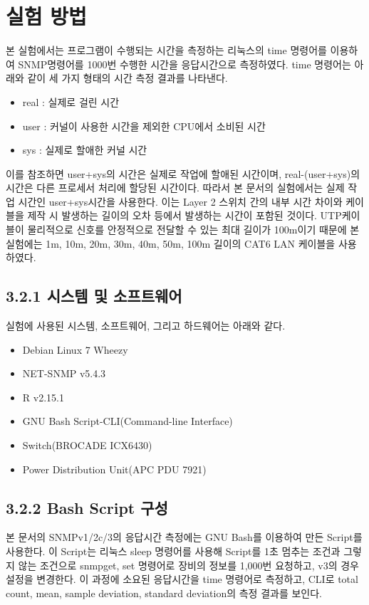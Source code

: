 \documentclass[11pt
  , a4paper
  , article
  , oneside
]{memoir}
\begin{document}
\section{실험 방법}
본 실험에서는 프로그램이 수행되는 시간을 측정하는 리눅스의 time 명령어를 이용하여 SNMP명령어를 1000번 수행한 시간을 응답시간으로 측정하였다. time 명령어는 아래와 같이 세 가지 형태의 시간 측정 결과를 나타낸다\citep{time_command}. 
\begin{itemize}
\item real : 실제로 걸린 시간
\item user : 커널이 사용한 시간을 제외한 CPU에서 소비된 시간
\item sys : 실제로 할애한 커널 시간
\end{itemize}
이를 참조하면 user+sys의 시간은 실제로 작업에 할애된 시간이며, real-(user+sys)의 시간은 다른 프로세서 처리에 할당된 시간이다. 따라서 본 문서의 실험에서는 실제 작업 시간인 user+sys시간을 사용한다. 이는 Layer 2 스위치 간의 내부 시간 차이와 케이블을 제작 시 발생하는 길이의 오차 등에서 발생하는 시간이 포함된 것이다. UTP케이블이 물리적으로 신호를 안정적으로 전달할 수 있는 최대 길이가 100m이기 때문에 본 실험에는 1m, 10m, 20m, 30m, 40m, 50m, 100m 길이의 CAT6 LAN 케이블을 사용하였다.

\subsection{3.2.1 시스템 및 소프트웨어}
실험에 사용된 시스템, 소프트웨어, 그리고 하드웨어는 아래와 같다.

\begin{itemize}
\item Debian Linux 7 Wheezy
\item NET-SNMP v5.4.3
\item R v2.15.1
\item GNU Bash Script-CLI(Command-line Interface) 
\item Switch(BROCADE ICX6430)
\item Power Distribution Unit(APC PDU 7921)
\end{itemize}

\subsection{3.2.2 Bash Script 구성}
본 문서의 SNMPv1/2c/3의 응답시간 측정에는 GNU Bash를 이용하여 만든 Script를 사용한다. 이 Script는 리눅스 sleep 명령어를 사용해 Script를 1초 멈추는 조건과 그렇지 않는 조건으로 snmpget, set 명령어로 장비의 정보를 1,000번 요청하고, v3의 경우 설정을 변경한다. 이 과정에 소요된 응답시간을 time 명령어로 측정하고, CLI로 total count, mean, sample deviation, standard deviation의 측정 결과를 보인다.
\end{document}
